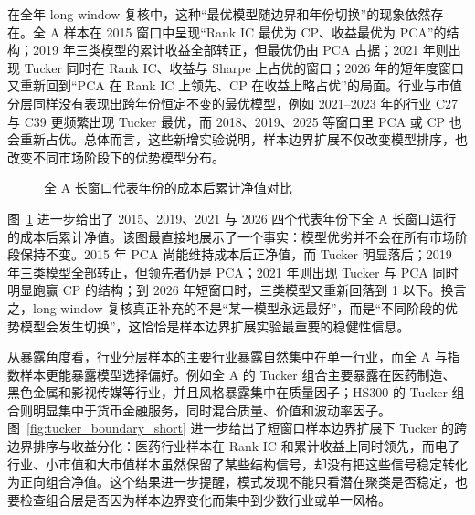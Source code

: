 在全年 long-window 复核中，这种“最优模型随边界和年份切换”的现象依然存在。全 A 样本在 2015 窗口中呈现“Rank IC 最优为 CP、收益最优为 PCA”的结构；2019 年三类模型的累计收益全部转正，但最优仍由 PCA 占据；2021 年则出现 Tucker 同时在 Rank IC、收益与 Sharpe 上占优的窗口；2026 年的短年度窗口又重新回到“PCA 在 Rank IC 上领先、CP 在收益上略占优”的局面。行业与市值分层同样没有表现出跨年份恒定不变的最优模型，例如 2021--2023 年的行业 C27 与 C39 更频繁出现 Tucker 最优，而 2018、2019、2025 等窗口里 PCA 或 CP 也会重新占优。总体而言，这些新增实验说明，样本边界扩展不仅改变模型排序，也改变不同市场阶段下的优势模型分布。

\begin{figure}[!t]
\centering
{}
\caption{全 A 长窗口代表年份的成本后累计净值对比}
\label{fig:all_a_long_window_cost}
\end{figure}

图~\ref{fig:all_a_long_window_cost} 进一步给出了 2015、2019、2021 与 2026 四个代表年份下全 A 长窗口运行的成本后累计净值。该图最直接地展示了一个事实：模型优劣并不会在所有市场阶段保持不变。2015 年 PCA 尚能维持成本后正净值，而 Tucker 明显落后；2019 年三类模型全部转正，但领先者仍是 PCA；2021 年则出现 Tucker 与 PCA 同时明显跑赢 CP 的结构；到 2026 年短窗口时，三类模型又重新回落到 1 以下。换言之，long-window 复核真正补充的不是“某一模型永远最好”，而是“不同阶段的优势模型会发生切换”，这恰恰是样本边界扩展实验最重要的稳健性信息。

从暴露角度看，行业分层样本的主要行业暴露自然集中在单一行业，而全 A 与指数样本更能暴露模型选择偏好。例如全 A 的 Tucker 组合主要暴露在医药制造、黑色金属和影视传媒等行业，并且风格暴露集中在质量因子；HS300 的 Tucker 组合则明显集中于货币金融服务，同时混合质量、价值和波动率因子。图~\ref{fig:tucker_boundary_short} 进一步给出了短窗口样本边界扩展下 Tucker 的跨边界排序与收益分化：医药行业样本在 Rank IC 和累计收益上同时领先，而电子行业、小市值和大市值样本虽然保留了某些结构信号，却没有把这些信号稳定转化为正向组合净值。这个结果进一步提醒，模式发现不能只看潜在聚类是否稳定，也要检查组合层是否因为样本边界变化而集中到少数行业或单一风格。

